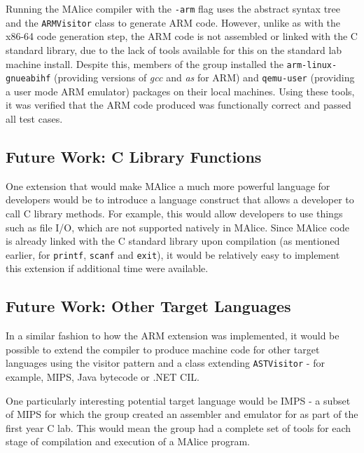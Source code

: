 \documentclass[a4wide, 11pt]{article}
\begin{document}
Running the MAlice compiler with the \texttt{-arm} flag uses the abstract syntax
tree and the \texttt{ARMVisitor} class to generate ARM code. However, unlike 
as with the x86-64 code generation step, the ARM code is not assembled or linked
with the C standard library, due to the lack of tools available for this on the
standard lab machine install. Despite this, members of the group installed the 
\texttt{arm-linux-gnueabihf} (providing versions of \emph{gcc} and \emph{as} for 
ARM) and \texttt{qemu-user} (providing a user mode ARM emulator) packages on 
their local machines. Using these tools, it was verified that the ARM code 
produced was functionally correct and passed all test cases.

\newpage

\subsection{Future Work: C Library Functions}

One extension that would make MAlice a much more powerful language for 
developers would be to introduce a language construct that allows a developer 
to call C library methods. For example, this would allow developers to use 
things such as file I/O, which are not supported natively in MAlice. Since 
MAlice code is already linked with the C standard library upon compilation
(as mentioned earlier, for \texttt{printf}, \texttt{scanf} and \texttt{exit}),
it would be relatively easy to implement this extension if additional time
were available.

\subsection{Future Work: Other Target Languages}
In a similar fashion to how the ARM extension was implemented, it would be 
possible to extend the compiler to produce machine code for other target 
languages using the visitor pattern and a class extending \texttt{ASTVisitor} -
for example, MIPS, Java bytecode or .NET CIL. 

One particularly interesting potential target language would be IMPS - a subset
of MIPS for which the group created an assembler and emulator for as part of the
first year C lab. This would mean the group had a complete set of tools for
each stage of compilation and execution of a MAlice program.

\enddocument
\end{document}
